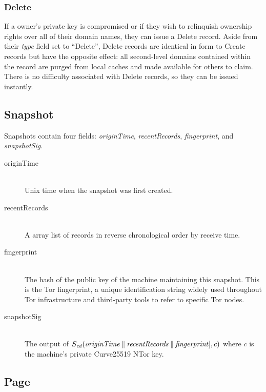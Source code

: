 \subsubsection{Delete}


If a owner's private key is compromised or if they wish to relinquish ownership rights over all of their domain names, they can issue a Delete record. Aside from their \emph{type} field set to ``Delete'', Delete records are identical in form to Create records but have the opposite effect: all second-level domains contained within the record are purged from local caches and made available for others to claim. There is no difficulty associated with Delete records, so they can be issued instantly.

\subsection{Snapshot}

Snapshots contain four fields: \emph{originTime}, \emph{recentRecords}, \emph{fingerprint}, and \emph{snapshotSig}.

\begin{description}
	\item[originTime] \hfill \\
		Unix time when the snapshot was first created.
	\item[recentRecords] \hfill \\
		A array list of records in reverse chronological order by receive time.
	\item[fingerprint] \hfill \\
		The hash of the public key of the machine maintaining this snapshot. This is the Tor fingerprint, a unique identification string widely used throughout Tor infrastructure and third-party tools to refer to specific Tor nodes.
	\item[snapshotSig] \hfill \\
		The output of $ S_{\mathit{ed}}(\mathit{originTime} \mathbin{\|} \mathit{recentRecords} \mathbin{\|} \mathit{fingerprint}], c) $ where $ c $ is the machine's private Curve25519 NTor key.
\end{description}

\subsection{Page}

